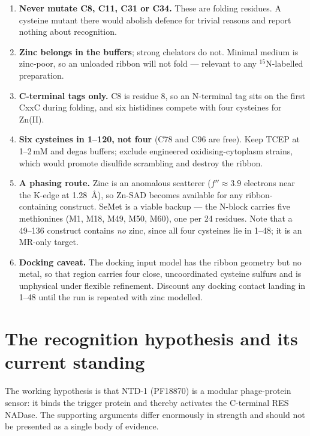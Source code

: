 \documentclass[11pt,a4paper]{article}
\begin{document}
\begin{enumerate}\itemsep3pt
\item \textbf{Never mutate C8, C11, C31 or C34.} These are folding residues. A
      cysteine mutant there would abolish defence for trivial reasons and report
      nothing about recognition.
\item \textbf{Zinc belongs in the buffers}; strong chelators do not. Minimal
      medium is zinc-poor, so an unloaded ribbon will not fold --- relevant to
      any $^{15}$N-labelled preparation.
\item \textbf{C-terminal tags only.} C8 is residue 8, so an N-terminal tag sits
      on the first CxxC during folding, and six histidines compete with four
      cysteines for Zn(II).
\item \textbf{Six cysteines in 1--120, not four} (C78 and C96 are free). Keep
      TCEP at 1--2\,mM and degas buffers; exclude engineered
      oxidising-cytoplasm strains, which would promote disulfide scrambling and
      destroy the ribbon.
\item \textbf{A phasing route.} Zinc is an anomalous scatterer
      ($f'' \approx 3.9$ electrons near the K-edge at \SI{1.28}{\angstrom}), so
      Zn-SAD becomes available for any ribbon-containing construct. SeMet is a
      viable backup --- the N-block carries five methionines (M1, M18, M49, M50,
      M60), one per 24 residues. Note that a 49--136 construct contains
      \emph{no} zinc, since all four cysteines lie in 1--48; it is an MR-only
      target.
\item \textbf{Docking caveat.} The docking input model has the ribbon geometry
      but no metal, so that region carries four close, uncoordinated cysteine
      sulfurs and is unphysical under flexible refinement. Discount any docking
      contact landing in 1--48 until the run is repeated with zinc modelled.
\end{enumerate}

\section{The recognition hypothesis and its current standing}
\label{sec:recognition}

The working hypothesis is that NTD-1 (PF18870) is a modular phage-protein sensor:
it binds the trigger protein and thereby activates the C-terminal RES NADase.
The supporting arguments differ enormously in strength and should not be
presented as a single body of evidence.
\end{document}
